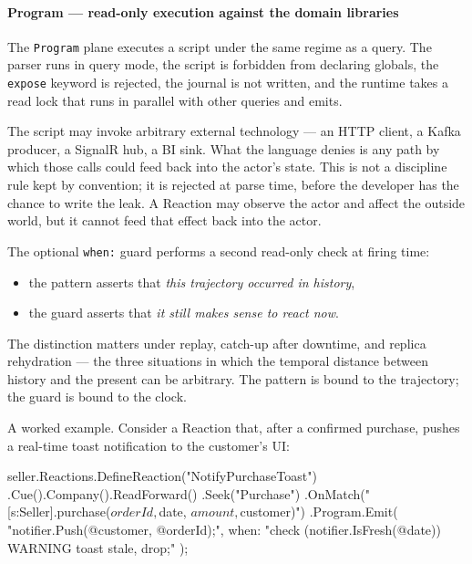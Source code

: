 \documentclass[
]{article}
\newenvironment{Shaded}{}{}
\newcommand{\NormalTok}[1]{#1}
\providecommand{\tightlist}{%
  \setlength{\itemsep}{0pt}\setlength{\parskip}{0pt}}
\let\origtexttt\texttt%
\renewcommand{\texttt}[1]{\origtexttt{\seqsplit{#1}}}%
\let\texttt\origtexttt%
\begin{document}
\paragraph{Program --- read-only execution against the domain
libraries}\label{program-read-only-execution-against-the-domain-libraries}

The \texttt{Program} plane executes a script under the same regime as a
query. The parser runs in query mode, the script is forbidden from
declaring globals, the \texttt{expose} keyword is rejected, the journal
is not written, and the runtime takes a read lock that runs in parallel
with other queries and emits.

The script may invoke arbitrary external technology --- an HTTP client,
a Kafka producer, a SignalR hub, a BI sink. What the language denies is
any path by which those calls could feed back into the actor's state.
This is not a discipline rule kept by convention; it is rejected at
parse time, before the developer has the chance to write the leak. A
Reaction may observe the actor and affect the outside world, but it
cannot feed that effect back into the actor.

The optional \texttt{when:} guard performs a second read-only check at
firing time:

\begin{itemize}
\tightlist
\item
  the pattern asserts that \emph{this trajectory occurred in history},
\item
  the guard asserts that \emph{it still makes sense to react now}.
\end{itemize}

The distinction matters under replay, catch-up after downtime, and
replica rehydration --- the three situations in which the temporal
distance between history and the present can be arbitrary. The pattern
is bound to the trajectory; the guard is bound to the clock.

A worked example. Consider a Reaction that, after a confirmed purchase,
pushes a real-time toast notification to the customer's UI:

\begin{Shaded}
\begin{Highlighting}[]
\NormalTok{seller.Reactions.DefineReaction("NotifyPurchaseToast")}
\NormalTok{    .Cue().Company().ReadForward()}
\NormalTok{    .Seek("Purchase")}
\NormalTok{        .OnMatch("[s:Seller].purchase($orderId, $date, $amount, $customer)")}
\NormalTok{    .Program.Emit(}
\NormalTok{        "notifier.Push(@customer, @orderId);",}
\NormalTok{        when: "check (notifier.IsFresh(@date)) WARNING \textquotesingle{}toast stale, drop\textquotesingle{};"}
\NormalTok{    );}
\end{Highlighting}
\end{Shaded}
\end{document}
